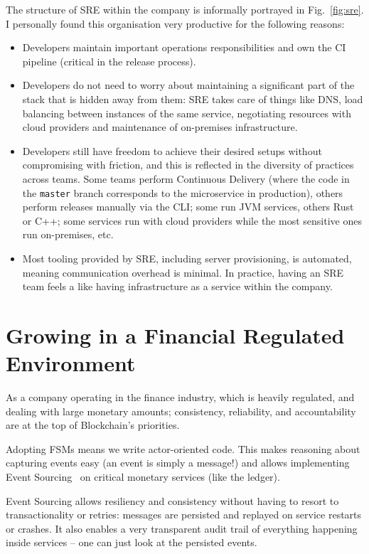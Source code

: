 \documentclass[conference]{IEEEtran}
\begin{document}
    The structure of SRE within the company is informally portrayed in Fig.~\ref{fig:sre}.
    I personally found this organisation very productive for the following reasons:
    \begin{itemize}
        \item Developers maintain important operations responsibilities and own the CI pipeline (critical in the release process).
        \item Developers do not need to worry about maintaining a significant part of the stack that is hidden away from them: SRE takes care of things like DNS, load balancing between instances of the same service, negotiating resources with cloud providers and maintenance of on-premises infrastructure.
        \item Developers still have freedom to achieve their desired setups without compromising with friction, and this is reflected in the diversity of practices across teams.
        Some teams perform Continuous Delivery (where the code in the \texttt{master} branch corresponds to the microservice in production), others perform releases manually via the CLI; some run JVM services, others Rust or C++;
        some services run with cloud providers while the most sensitive ones run on-premises, etc.
        \item Most tooling provided by SRE, including server provisioning, is automated, meaning communication overhead is minimal.
        In practice, having an SRE team feels a like having infrastructure as a service within the company.
    \end{itemize}


    \section{Growing in a Financial Regulated Environment}\label{sec:regulated}

    As a company operating in the finance industry, which is heavily regulated, and dealing
    with large monetary amounts;
    consistency, reliability, and accountability are at the top of Blockchain's priorities.

    Adopting FSMs means we write actor-oriented code.
    This makes reasoning about capturing events easy (an event is simply a message!) and allows
    implementing Event Sourcing~\cite{fowlerES} on critical monetary services (like the ledger).

    Event Sourcing allows resiliency and consistency without having to resort to transactionality
    or retries: messages are persisted and replayed on service restarts or crashes.
    It also enables a very transparent audit trail of everything happening inside services -- one
    can just look at the persisted events.\\
\end{document}

